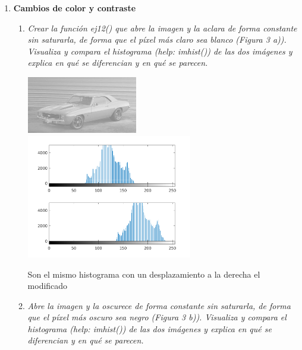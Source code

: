 \documentclass{article}
\begin{document}
\begin{enumerate}
\newpage

 \item \textbf{Cambios de color y contraste}

 \begin{enumerate}
 \item \textit{Crear la función ej12() que abre la imagen y la aclara de forma constante sin saturarla, de forma que el píxel más claro sea blanco (Figura 3 a)). Visualiza y compara el histograma (help: imhist()) de las dos imágenes y explica en qué se diferencian y en qué se parecen.}

 \begin{center}
 \includegraphics[width=0.4\textwidth]{car_bright.jpg}
 \includegraphics[width=0.6\textwidth]{subplot_2_high.png}
 \end{center}

 Son el mismo histograma con un desplazamiento a la derecha el modificado

 \item \textit{Abre la imagen y la oscurece de forma constante sin
saturarla, de forma que el píxel más oscuro sea negro (Figura 3 b)). Visualiza y compara el histograma (help: imhist()) de las dos imágenes y explica en qué se diferencian y en qué se parecen.}


\end{enumerate}
\end{enumerate}
\end{document}
